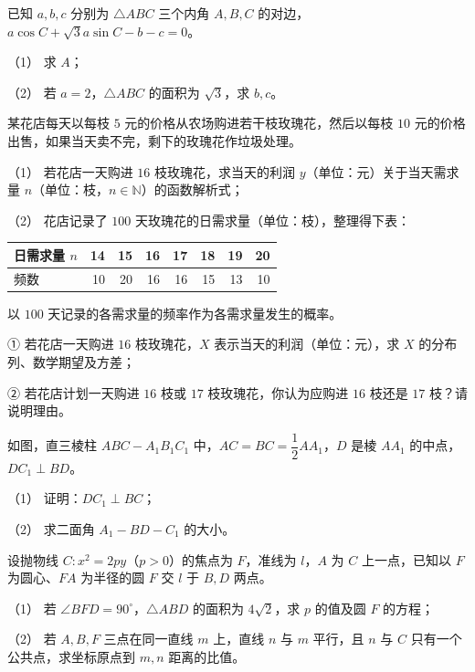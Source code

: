 \begin{question}
已知 $a,b,c$ 分别为 $\triangle ABC$ 三个内角 $A,B,C$ 的对边，$a\cos C+\sqrt3a\sin C-b-c=0$。

（1） 求 $A$；

（2） 若 $a=2$，$\triangle ABC$ 的面积为 $\sqrt3$，求 $b,c$。

\end{question}
\begin{question}
某花店每天以每枝 $5$ 元的价格从农场购进若干枝玫瑰花，然后以每枝 $10$ 元的价格出售，如果当天卖不完，剩下的玫瑰花作垃圾处理。

（1） 若花店一天购进 $16$ 枝玫瑰花，求当天的利润 $y$（单位：元）关于当天需求量 $n$（单位：枝，$n\in\mathbb N$）的函数解析式；

（2） 花店记录了 $100$ 天玫瑰花的日需求量（单位：枝），整理得下表：

\begin{center}
\begingroup\setlength{\tabcolsep}{4pt}
\begin{tabular}{lrrrrrrr}
\toprule
日需求量 $n$ & 14 & 15 & 16 & 17 & 18 & 19 & 20 \\
\midrule
频数 & 10 & 20 & 16 & 16 & 15 & 13 & 10 \\
\bottomrule
\end{tabular}
\endgroup
\end{center}

以 $100$ 天记录的各需求量的频率作为各需求量发生的概率。

① 若花店一天购进 $16$ 枝玫瑰花，$X$ 表示当天的利润（单位：元），求 $X$ 的分布列、数学期望及方差；

② 若花店计划一天购进 $16$ 枝或 $17$ 枝玫瑰花，你认为应购进 $16$ 枝还是 $17$ 枝？请说明理由。

\Needspace{0.4\textheight}
\end{question}
\begin{question}
如图，直三棱柱 $ABC-A_1B_1C_1$ 中，$AC=BC=\dfrac12AA_1$，$D$ 是棱 $AA_1$ 的中点，$DC_1\perp BD$。
\nopagebreak[4]
\begin{center}\end{center}
\nopagebreak[4]
（1） 证明：$DC_1\perp BC$；

（2） 求二面角 $A_1-BD-C_1$ 的大小。

\end{question}
\begin{question}
设抛物线 $C:x^2=2py$（$p>0$）的焦点为 $F$，准线为 $l$，$A$ 为 $C$ 上一点，已知以 $F$ 为圆心、$FA$ 为半径的圆 $F$ 交 $l$ 于 $B,D$ 两点。

（1） 若 $\angle BFD=90^\circ$，$\triangle ABD$ 的面积为 $4\sqrt2$，求 $p$ 的值及圆 $F$ 的方程；

（2） 若 $A,B,F$ 三点在同一直线 $m$ 上，直线 $n$ 与 $m$ 平行，且 $n$ 与 $C$ 只有一个公共点，求坐标原点到 $m,n$ 距离的比值。

\end{question}

